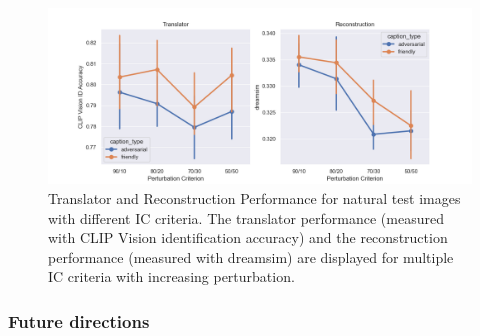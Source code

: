 \begin{figure}[ht]
    \centering
    \includegraphics[width=1\textwidth]{plots/advpert_discussion_explore_pert_ratio_test_translator_and_recon.png}
    \caption[Translator/Reconstruction Performance for natural test images with different IC criteria]{Translator and Reconstruction Performance for natural test images with different IC criteria. The translator performance (measured with CLIP Vision identification accuracy) and the reconstruction performance (measured with dreamsim) are displayed for multiple IC criteria with increasing perturbation.}\label{fig:advpert_discussion_explore_pert_ratio_test_translator_and_recon}
\end{figure}

\subsubsection{Future directions}

